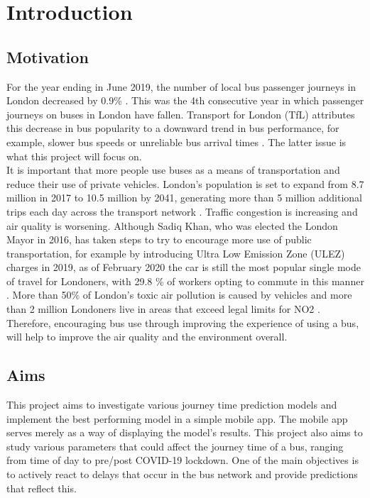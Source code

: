 \section{Introduction}

\subsection{Motivation}

For the year ending in June 2019, the number of local bus passenger journeys in London decreased by 0.9\% \cite{quarterly-bus-stats}. This was the 4th consecutive year in which passenger journeys on buses in London have fallen. Transport for London (TfL) attributes this decrease in bus popularity to a downward trend in bus performance, for example, slower bus speeds or unreliable bus arrival times \cite{annual-bus-stats}. The latter issue is what this project will focus on. \\ 

It is important that more people use buses as a means of transportation and reduce their use of private vehicles. London's population is set to expand from 8.7 million in 2017 to 10.5 million by 2041, generating more than 5 million additional trips each day across the transport network \cite{mayor-reduce-car-use}. Traffic congestion is increasing and air quality is worsening. Although Sadiq Khan, who was elected the London Mayor in 2016, has taken steps to try to encourage more use of public transportation, for example by introducing Ultra Low Emission Zone (ULEZ) charges in 2019, as of February 2020 the car is still the most popular single mode of travel for Londoners, with 29.8 \% of workers opting to commute in this manner \cite{motoring-faqs}. More than 50\% of London's toxic air pollution is caused by vehicles and more than 2 million Londoners live in areas that exceed legal limits for NO2 \cite{mayor-car-free-day}. Therefore, encouraging bus use through improving the experience of using a bus, will help to improve the air quality and the environment overall.

\subsection{Aims}

This project aims to investigate various journey time prediction models and implement the best performing model in a simple mobile app. The mobile app serves merely as a way of displaying the model's results. This project also aims to study various parameters that could affect the journey time of a bus, ranging from time of day to pre/post COVID-19 lockdown. One of the main objectives is to actively react to delays that occur in the bus network and provide predictions that reflect this. \\

